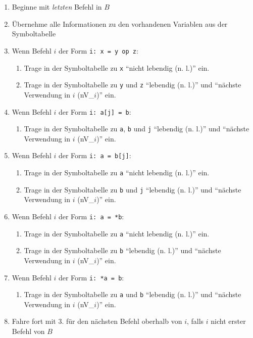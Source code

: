\documentclass[a4paper,10pt]{scrartcl}
\renewcommand{\labelenumi}{\theenumi)}
\renewcommand{\theenumi}{\alph{enumi}}
\begin{document}
\section{}
\renewcommand{\labelenumi}{\theenumi.}
\renewcommand{\theenumi}{\arabic{enumi}}
\renewcommand{\theenumii}{\arabic{enumi}.\arabic{enumii}}
\begin{enumerate}
\item   Beginne mit \emph{letzten} Befehl in $B$
\item   Übernehme alle Informationen zu den vorhandenen Variablen aus der Symboltabelle
\item   Wenn Befehl $i$ der Form \texttt{i:\ x = y op z}:
	\begin{enumerate}
	\item   Trage in der Symboltabelle zu \texttt{x} "`nicht lebendig (n. l.)"' ein.
	\item   Trage in der Symboltabelle zu \texttt{y} und \texttt{z} "`lebendig (n. l.)"' und "`nächste Verwendung in $i$ (nV\_$i$)"' ein.
	\end{enumerate}
\item   Wenn Befehl $i$ der Form \texttt{i:\ a[j] = b}:
	\begin{enumerate}
	\item   Trage in der Symboltabelle zu \texttt{a}, \texttt{b} und \texttt{j} "`lebendig (n. l.)"' und "`nächste Verwendung in $i$ (nV\_$i$)"' ein.
	\end{enumerate}
\item   Wenn Befehl $i$ der Form \texttt{i:\ a = b[j]}:
	\begin{enumerate}
	\item   Trage in der Symboltabelle zu \texttt{a} "`nicht lebendig (n. l.)"' ein.
	\item   Trage in der Symboltabelle zu \texttt{b} und \texttt{j} "`lebendig (n. l.)"' und "`nächste Verwendung in $i$ (nV\_$i$)"' ein.
	\end{enumerate}
\item   Wenn Befehl $i$ der Form \texttt{i:\ a = *b}:
	\begin{enumerate}
	\item   Trage in der Symboltabelle zu \texttt{a} "`nicht lebendig (n. l.)"' ein.
	\item   Trage in der Symboltabelle zu \texttt{b} "`lebendig (n. l.)"' und "`nächste Verwendung in $i$ (nV\_$i$)"' ein.
	\end{enumerate}
\item   Wenn Befehl $i$ der Form \texttt{i:\ *a = b}:
	\begin{enumerate}
	\item   Trage in der Symboltabelle zu \texttt{a} und \texttt{b} "`lebendig (n. l.)"' und "`nächste Verwendung in $i$ (nV\_$i$)"' ein.
	\end{enumerate}
\item   Fahre fort mit 3. für den nächsten Befehl oberhalb von $i$, falls $i$ nicht erster Befehl von $B$
\end{enumerate}
\end{document}

